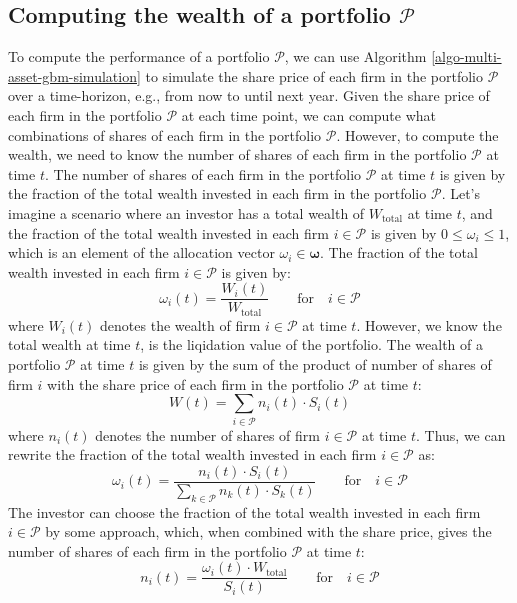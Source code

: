 \documentclass[11pt]{article}
\theoremstyle{definition}
\begin{document}
\subsection*{Computing the wealth of a portfolio $\mathcal{P}$}
To compute the performance of a portfolio $\mathcal{P}$, we can use Algorithm \ref{algo-multi-asset-gbm-simulation} 
to simulate the share price of each firm in the portfolio $\mathcal{P}$ over a time-horizon, e.g., from now to until next year.
Given the share price of each firm in the portfolio $\mathcal{P}$ at each time point, we can compute what combinations of shares of each firm in the portfolio $\mathcal{P}$.	
However, to compute the wealth, we need to know the number of shares of each firm in the portfolio $\mathcal{P}$ at time $t$.
The number of shares of each firm in the portfolio $\mathcal{P}$ at time $t$ is given by the fraction of the total wealth invested in each firm in the portfolio $\mathcal{P}$.
Let's imagine a scenario where an investor has a total wealth of $W_{\text{total}}$ at time $t$, 
and the fraction of the total wealth invested in each firm $i\in\mathcal{P}$
is given by $0\leq{\omega_{i}}\leq{1}$, which is an element of the allocation vector $\omega_{i}\in\mathbf{\omega}$.
The fraction of the total wealth invested in each firm $i\in\mathcal{P}$ is given by:
\begin{equation*}
\omega_{i}(t) = \frac{W_{i}(t)}{W_{\text{total}}}\qquad\text{for}\quad{i\in\mathcal{P}}
\end{equation*}
where $W_{i}(t)$ denotes the wealth of firm $i\in\mathcal{P}$ at time $t$.
However, we know the total wealth at time $t$, is the liqidation value of the portfolio. The wealth of a portfolio $\mathcal{P}$ at time $t$ 
is given by the sum of the product of number of shares of firm $i$ with the share price of each firm in the portfolio $\mathcal{P}$ at time $t$:
\begin{equation*}
W(t) = \sum_{i\in\mathcal{P}}n_{i}(t)\cdot{S_{i}(t)}
\end{equation*}
where $n_{i}(t)$ denotes the number of shares of firm $i\in\mathcal{P}$ at time $t$.
Thus, we can rewrite the fraction of the total wealth invested in each firm $i\in\mathcal{P}$ as:
\begin{equation*}
\omega_{i}(t) = \frac{n_{i}(t)\cdot{S_{i}(t)}}{\displaystyle\sum_{k\in\mathcal{P}}n_{k}(t)\cdot{S}_{k}(t)}\qquad\text{for}\quad{i\in\mathcal{P}}
\end{equation*}
The investor can choose the fraction of the total wealth invested in each firm $i\in\mathcal{P}$ by some approach,
which, when combined with the share price, gives the number of shares of each firm in the portfolio $\mathcal{P}$ at time $t$:
\begin{equation*}
n_{i}(t) = \frac{\omega_{i}(t)\cdot{W_{\text{total}}}}{S_{i}(t)}\qquad\text{for}\quad{i\in\mathcal{P}}
\end{equation*}
\end{document}
